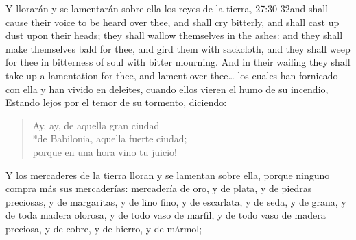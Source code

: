 Y llorarán y se lamentarán sobre ella los reyes de la tierra,%
	{27:30-32}{and shall cause their voice to be heard over thee, and shall cry bitterly, and shall cast up dust upon their heads; they shall wallow themselves in the ashes: and they shall make themselves bald for thee, and gird them with sackcloth, and they shall weep for thee in bitterness %
	of soul with bitter mourning. And in their wailing they shall take up a lamentation for thee, and lament over thee\ldots}
 los cuales han fornicado con ella y han vivido en deleites, cuando ellos vieren el humo de su incendio, 
Estando lejos por el temor de su tormento, diciendo:  
\begin{verse}
Ay, ay, de aquella gran ciudad\\*\vin de Babilonia, aquella fuerte ciudad;\\ porque en una hora vino tu juicio! 
\end{verse}
Y los mercaderes de la tierra lloran y se lamentan sobre ella,%
 porque ninguno compra más sus mercaderías: 
mercadería de oro, y de plata, y de piedras preciosas, y de margaritas, y de lino fino, y de escarlata, y de seda, y de grana, y de toda madera olorosa, y de todo vaso de marfil, y de todo vaso de madera preciosa, y de cobre, y de hierro, y de mármol;%

